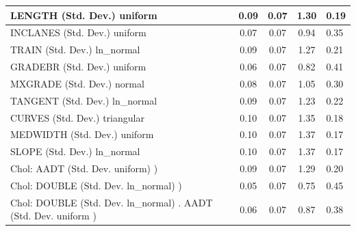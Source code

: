 \begin{table}
\begin{center}
\begin{tabular}{|l|l|c|c|c|l|}
			\hline
			LENGTH (Std. Dev.) uniform &  & 0.09 & 0.07 & 1.30 & 0.19 \\
			\hline
			INCLANES (Std. Dev.) uniform &  & 0.07 & 0.07 & 0.94 & 0.35 \\
			\hline
			TRAIN (Std. Dev.) ln_normal &  & 0.09 & 0.07 & 1.27 & 0.21 \\
			\hline
			GRADEBR (Std. Dev.) uniform &  & 0.06 & 0.07 & 0.82 & 0.41 \\
			\hline
			MXGRADE (Std. Dev.) normal &  & 0.08 & 0.07 & 1.05 & 0.30 \\
			\hline
			TANGENT (Std. Dev.) ln_normal &  & 0.09 & 0.07 & 1.23 & 0.22 \\
			\hline
			CURVES (Std. Dev.) triangular &  & 0.10 & 0.07 & 1.35 & 0.18 \\
			\hline
			MEDWIDTH (Std. Dev.) uniform &  & 0.10 & 0.07 & 1.37 & 0.17 \\
			\hline
			SLOPE (Std. Dev.) ln_normal &  & 0.10 & 0.07 & 1.37 & 0.17 \\
			\hline
			 Chol: AADT (Std. Dev. uniform) ) &  & 0.09 & 0.07 & 1.29 & 0.20 \\
			\hline
			 Chol: DOUBLE (Std. Dev. ln_normal) ) &  & 0.05 & 0.07 & 0.75 & 0.45 \\
			\hline
			 Chol: DOUBLE (Std. Dev. ln_normal) . AADT (Std. Dev.   uniform ) &  & 0.06 & 0.07 & 0.87 & 0.38 \\
			\hline
		\end{tabular}
	\end{center}
\end{table}